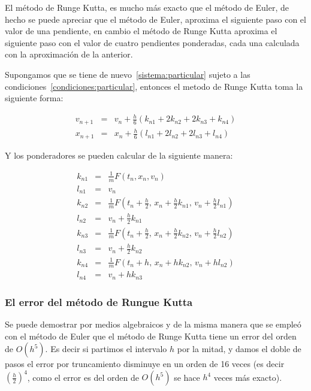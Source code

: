 El método de Runge Kutta, es mucho más exacto que el método de Euler, de hecho se puede apreciar que el método de Euler, aproxima el siguiente paso con el valor de una pendiente, en cambio el método de Runge Kutta aproxima el siguiente paso con el valor de cuatro pendientes ponderadas, cada una calculada con la aproximación de la anterior.

Supongamos que se tiene de nuevo~\ref{sistema:particular} sujeto a las condiciones~\ref{condiciones:particular}, entonces el metodo de Runge Kutta toma la siguiente forma:

\begin{eqnarray}
v_{n+1} & = & v_n + \frac{h}{6}(k_{n1} + 2k_{n2} + 2k_{n3} + k_{n4}) \nonumber \\
x_{n+1} & = & x_n + \frac{h}{6}(l_{n1} + 2l_{n2} + 2l_{n3} + l_{n4})
\label{formulas:RK4}
\end{eqnarray}

Y los ponderadores se pueden calcular de la siguiente manera:

\begin{eqnarray}
k_{n1} & = & \frac{1}{m}F(t_n, x_n, v_n) \nonumber \\
l_{n1} & = & v_n \nonumber \\
k_{n2} & = & \frac{1}{m}F(t_n + \frac{h}{2}, \, x_n + \frac{h}{2}k_{n1}, \, v_n + \frac{h}{2}l_{n1}) \nonumber \\
l_{n2} & = & v_n + \frac{h}{2}k_{n1} \nonumber \\
k_{n3} & = & \frac{1}{m}F(t_n + \frac{h}{2}, \, x_n + \frac{h}{2}k_{n2}, \, v_n + \frac{h}{2}l_{n2}) \nonumber \\
l_{n3} & = & v_n + \frac{h}{2}k_{n2} \nonumber \\
k_{n4} & = & \frac{1}{m}F(t_n + h, \, x_n +hk_{n2}, \, v_n + hl_{n2}) \nonumber \\
l_{n4} & = & v_n + hk_{n3}
\label{ponderadores:RK4}
\end{eqnarray}

\subsubsection{El error del método de Rungue Kutta}
Se puede demostrar por medios algebraicos y de la misma manera que se empleó con el método de Euler que el método de Runge Kutta tiene un error del orden de $O(h^5)$. Es decir si partimos el intervalo $h$ por la mitad, y damos el doble de pasos el error por truncamiento disminuye en un orden de 16 veces (es decir $\left( \frac{h}{2} \right)^4$, como el error es del orden de $O(h^5)$ se hace $h^4$ veces más exacto).

